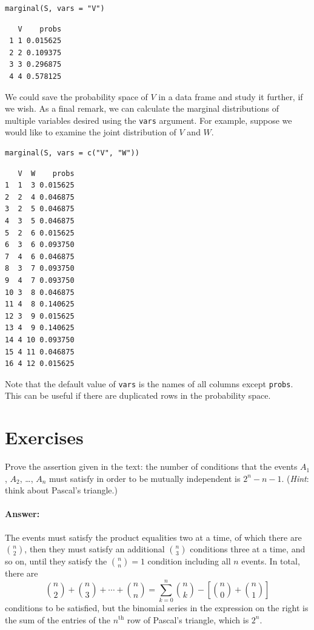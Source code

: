 \documentclass[captions=tableheading]{scrbook}
\begin{document}
\begin{verbatim}
marginal(S, vars = "V")
\end{verbatim}

\begin{verbatim}
   V    probs
 1 1 0.015625
 2 2 0.109375
 3 3 0.296875
 4 4 0.578125
\end{verbatim}

We could save the probability space of \(V\) in a data frame and study it further, if we wish. As a final remark, we can calculate the marginal distributions of multiple variables desired using the \texttt{vars} argument. For example, suppose we would like to examine the joint distribution of \(V\) and \(W\). 


\begin{verbatim}
marginal(S, vars = c("V", "W"))
\end{verbatim}


\begin{verbatim}
   V  W    probs
1  1  3 0.015625
2  2  4 0.046875
3  2  5 0.046875
4  3  5 0.046875
5  2  6 0.015625
6  3  6 0.093750
7  4  6 0.046875
8  3  7 0.093750
9  4  7 0.093750
10 3  8 0.046875
11 4  8 0.140625
12 3  9 0.015625
13 4  9 0.140625
14 4 10 0.093750
15 4 11 0.046875
16 4 12 0.015625
\end{verbatim}

Note that the default value of \texttt{vars} is the names of all columns except \texttt{probs}. This can be useful if there are duplicated rows in the probability space.

\newpage{}
\section{Exercises}
\label{sec-3-10}


\setcounter{thm}{0}

\begin{xca}
\label{xca:numb-cond-indep}
Prove the assertion given in the text: the number of conditions that the events \(A_{1}\), \(A_{2}\), \ldots{}, \(A_{n}\) must satisfy in order to be mutually independent is \(2^{n}-n-1\). (\emph{Hint}: think about Pascal's triangle.)
\end{xca}

\paragraph*{Answer:}

The events must satisfy the product equalities two at a time, of which there are \({n \choose 2}\), then they must satisfy an additional \({n \choose 3}\) conditions three at a time, and so on, until they satisfy the \({n \choose n}=1\) condition including all \(n\) events. In total, there are 
\[
{n \choose 2}+{n \choose 3}+\cdots+{n \choose n}=\sum_{k=0}^{n}{n \choose k}-\left[{n \choose 0}+{n \choose 1}\right]
\]
conditions to be satisfied, but the binomial series in the expression on the right is the sum of the entries of the \(n^{\mathrm{th}}\) row of Pascal's triangle, which is \(2^{n}\).
\end{document}
